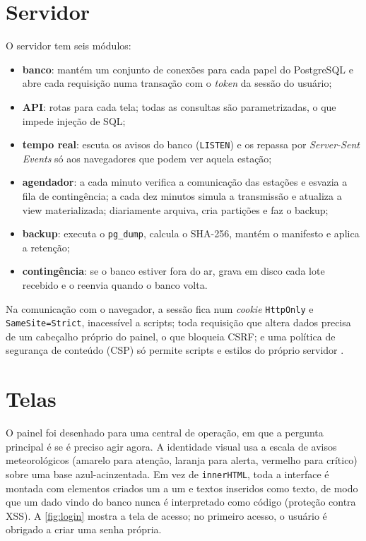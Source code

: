 \section{Servidor}

O servidor tem seis módulos:

\begin{itemize}
  \item \textbf{banco}: mantém um conjunto de conexões para cada papel do PostgreSQL e abre cada requisição numa transação com o \textit{token} da sessão do usuário;
  \item \textbf{API}: rotas para cada tela; todas as consultas são parametrizadas, o que impede injeção de SQL;
  \item \textbf{tempo real}: escuta os avisos do banco (\texttt{LISTEN}) e os repassa por \textit{Server-Sent Events} só aos navegadores que podem ver aquela estação;
  \item \textbf{agendador}: a cada minuto verifica a comunicação das estações e esvazia a fila de contingência; a cada dez minutos simula a transmissão e atualiza a view materializada; diariamente arquiva, cria partições e faz o backup;
  \item \textbf{backup}: executa o \texttt{pg\_dump}, calcula o SHA-256, mantém o manifesto e aplica a retenção;
  \item \textbf{contingência}: se o banco estiver fora do ar, grava em disco cada lote recebido e o reenvia quando o banco volta.
\end{itemize}

Na comunicação com o navegador, a sessão fica num \textit{cookie} \texttt{HttpOnly} e \texttt{SameSite=Strict}, inacessível a scripts; toda requisição que altera dados precisa de um cabeçalho próprio do painel, o que bloqueia CSRF; e uma política de segurança de conteúdo (CSP) só permite scripts e estilos do próprio servidor \parencite{owasp2021}.

\section{Telas}

O painel foi desenhado para uma central de operação, em que a pergunta principal é se é preciso agir agora. A identidade visual usa a escala de avisos meteorológicos (amarelo para atenção, laranja para alerta, vermelho para crítico) sobre uma base azul-acinzentada. Em vez de \texttt{innerHTML}, toda a interface é montada com elementos criados um a um e textos inseridos como texto, de modo que um dado vindo do banco nunca é interpretado como código (proteção contra XSS). A \autoref{fig:login} mostra a tela de acesso; no primeiro acesso, o usuário é obrigado a criar uma senha própria.


